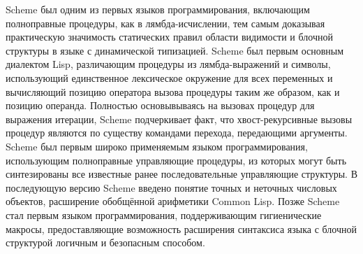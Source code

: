 Scheme был одним из первых языков программирования, включающим полноправные процедуры, как в
лямбда-исчислении, тем самым доказывая практическую значимость статических правил области видимости и
блочной структуры в языке с динамической типизацией. Scheme был первым основным диалектом Lisp,
различающим процедуры из лямбда-выражений и символы, использующий единственное лексическое
окружение для всех переменных и вычисляющий позицию оператора вызова процедуры таким же образом,
как и позицию операнда. Полностью основывываясь на вызовах процедур для выражения итерации,
Scheme подчеркивает факт, что хвост-рекурсивные вызовы процедур являются по существу командами
перехода, передающими аргументы. Scheme был первым широко применяемым языком программирования,
использующим полноправные управляющие процедуры, из которых могут быть синтезированы все известные
ранее последовательные управляющие структуры. В последующую версию Scheme введено понятие точных
и неточных числовых объектов, расширение обобщённой арифметики Common Lisp. Позже Scheme стал
первым языком программирования, поддерживающим гигиенические макросы, предоставляющие
возможность расширения синтаксиса языка с блочной структурой логичным и безопасным способом.\vspace{-3mm}

